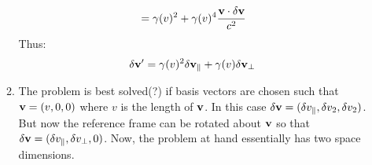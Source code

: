 \documentclass[12pt,a4]{article}
\begin{document}
\begin{enumerate}
\begin{enumerate}
\begin{align*}
                                                                       &= \gamma(v)^2 + \gamma(v)^4 \frac{{\bf v}\cdot \delta {\bf v}}{c^2}
        \end{align*}
        Thus:
        \begin{align*}
          \delta {\bf v}' &= \gamma(v)^2 \delta {\bf v}_\parallel +  \gamma(v) \delta {\bf v}_\perp
        \end{align*}
      \item
        The problem is best solved(?) if basis vectors are chosen such that ${\bf v} = (v, 0, 0)$ where $v$ is the length of ${\bf v}$.
        In this case ${\bf \delta v} = ( \delta v_\parallel, \delta v_2, \delta v_2)$.
        But now the reference frame can be rotated about ${\bf v}$ so that ${\bf \delta v} = ( \delta v_\parallel, \delta v_\perp, 0)$.
        Now, the problem at hand essentially has two space dimensions.%

\end{enumerate}
\end{enumerate}
\end{document}
